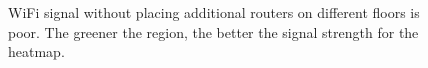 \documentclass[10pt]{sensys-proc}
\begin{document}
\begin{figure}
          \hspace{1mm}
    \caption{WiFi signal without placing additional routers on different floors is poor. The greener the region, the better the signal strength for the heatmap.}   
      
\end{figure}
\end{document}
